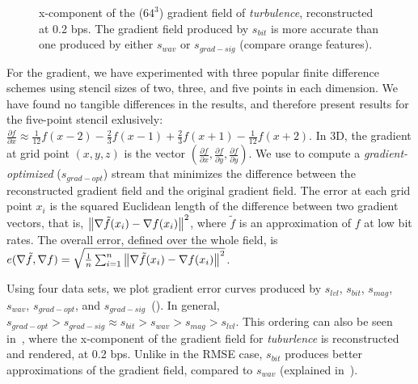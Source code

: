 \begin{figure}[h]
	\centering
	\caption{x-component of the ($64^3$) gradient field of \emph{turbulence}, reconstructed at 0.2
	bps. The gradient field produced by $s_{bit}$ is more accurate than one produced by either
	$s_{wav}$ or $s_{grad-sig}$ (compare orange features).}\label{fig:gradient-rendering-diff}
\end{figure}

For the gradient, we have experimented with three popular finite difference schemes using stencil
sizes of two, three, and five points in each dimension. We have found no tangible differences in the
results, and therefore present results for the five-point stencil exlusively: $\frac{\partial
f}{\partial x}\approx \frac{1}{12}f(x-2)-\frac{2}{3}f(x-1)+\frac{2}{3}f(x+1)-\frac{1}{12}f(x+2)$. In
3D, the gradient at grid point $(x,y,z)$ is the vector $(\frac{\partial f}{\partial
x},\frac{\partial f}{\partial y}, \frac{\partial f}{\partial y})$. We use 
to compute a \emph{gradient-optimized} ($s_{grad-opt}$) stream that minimizes the difference between
the reconstructed gradient field and the original gradient field. The error at each grid point $x_i$
is the squared Euclidean length of the difference between two gradient vectors, that is,
$\left\lVert\nabla \tilde{f}(x_i)-\nabla f(x_i)\right\rVert^2$, where $\tilde{f}$ is an approximation of $f$
at low bit rates. The overall error, defined over the whole field, is $e(\nabla \tilde{f},\nabla
f)=\sqrt{\frac{1}{n}\sum_{i=1}^{n}{\left\lVert\nabla \tilde{f}(x_i)-\nabla f(x_i)\right\rVert^2}}$.

Using four data sets, we plot gradient error curves produced by $s_{lvl}$, $s_{bit}$, $s_{mag}$,
$s_{wav}$, $s_{grad-opt}$, and $s_{grad-sig}$~(). In
general, $s_{grad-opt} > s_{grad-sig} \approx s_{bit} > s_{wav} > s_{mag} > s_{lvl}$. This ordering
can also be seen in~, where the x-component of the gradient
field for \emph{tuburlence} is reconstructed and rendered, at 0.2 bps. Unlike in the RMSE case,
$s_{bit}$ produces better approximations of the gradient field, compared to $s_{wav}$
(explained in~).

